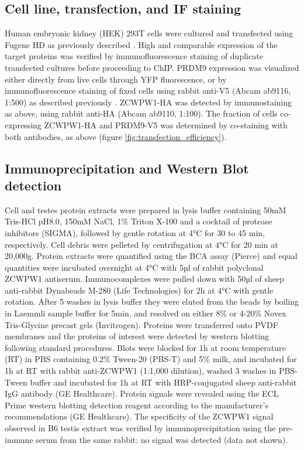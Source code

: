 \subsection{Cell line, transfection, and IF staining}
Human embryonic kidney (HEK) 293T cells were cultured and transfected using Fugene HD as previously described \parencite{Altemose2017map}.
High and comparable expression of the target proteins was verified by immunofluorescence staining of duplicate transfected cultures before proceeding to ChIP.
PRDM9 expression was visualized either directly from live cells through YFP fluorescence, or by immunofluorescence staining of fixed cells using rabbit anti-V5 (Abcam ab9116, 1:500) as described previously \parencite{Altemose2017map}.
ZCWPW1-HA was detected by immunostaining as above, using rabbit anti-HA (Abcam ab9110, 1:100).
The fraction of cells co-expressing ZCWPW1-HA and PRDM9-V5 was determined by co-staining with both antibodies, as above (figure \ref{fig:transfection_efficiency}).

\subsection{Immunoprecipitation and Western Blot detection}
\label{sec:IP}
Cell and testes protein extracts were prepared in lysis buffer containing 50mM Tris-HCl pH8.0, 150mM NaCl, 1\% Triton X-100 and a cocktail of protease inhibitors (SIGMA), followed by gentle rotation at 4°C for 30 to 45 min, respectively.
Cell debris were pelleted by centrifugation at 4°C for 20 min at 20,000g.
Protein extracts were quantified using the BCA assay (Pierce) and equal quantities were incubated overnight at 4°C with 5µl of rabbit polyclonal ZCWPW1 antiserum.
Immunocomplexes were pulled down with 50µl of sheep anti-rabbit Dynabeads M-280 (Life Technologies) for 2h at 4°C with gentle rotation.
After 5 washes in lysis buffer they were eluted from the beads by boiling in Laemmli sample buffer for 5min, and resolved on either 8\% or 4-20\% Novex Tris-Glycine precast gels (Invitrogen).
Proteins were transferred onto PVDF membranes and the proteins of interest were detected by western blotting following standard procedures.
Blots were blocked for 1h at room temperature (RT) in PBS containing 0.2\% Tween-20 (PBS-T) and 5\% milk, and incubated for 1h at RT with rabbit anti-ZCWPW1 (1:1,000 dilution), washed 3 washes in PBS-Tween buffer and incubated for 1h at RT with HRP-conjugated sheep anti-rabbit IgG antibody (GE Healthcare).
Protein signals were revealed using the ECL Prime western blotting detection reagent according to the manufacturer’s recommendations (GE Healthcare).
The specificity of the ZCWPW1 signal observed in B6 testis extract was verified by immunoprecipitation using the pre-immune serum from the same rabbit: no signal was detected (data not shown).

